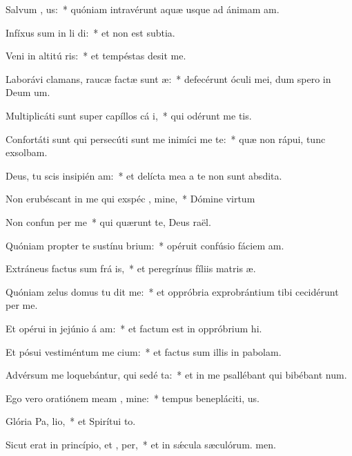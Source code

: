 \item Salvum  , us:~* quóniam intravérunt aquæ usque ad ánimam am.
\item Infíxus sum in li di:~* et non est subtia.
\item Veni in altitú ris:~* et tempéstas desit me.
\item Laborávi clamans, raucæ factæ sunt  æ:~* defecérunt óculi mei, dum spero in Deum um.
\item Multiplicáti sunt super capíllos cá i,~* qui odérunt me tis.
\item Confortáti sunt qui persecúti sunt me inimíci me te:~* quæ non rápui, tunc exsolbam.
\item Deus, tu scis insipién am:~* et delícta mea a te non sunt absdita.
\item Non erubéscant in me qui exspéc , mine,~* Dómine virtum
\item Non confun per me~* qui quærunt te, Deus raël.
\item Quóniam propter te sustínu brium:~* opéruit confúsio fáciem am.
\item Extráneus factus sum frá is,~* et peregrínus fíliis matris æ.
\item Quóniam zelus domus tu dit me:~* et oppróbria exprobrántium tibi cecidérunt per me.
\item Et opérui in jejúnio á am:~* et factum est in oppróbrium hi.
\item Et pósui vestiméntum me cium:~* et factus sum illis in pabolam.
\item Advérsum me loquebántur, qui sedé  ta:~* et in me psallébant qui bibébant num.
\item Ego vero oratiónem meam  , mine:~* tempus benepláciti, us.
\item Glória Pa,  lio,~* et Spirítui to.
\item Sicut erat in princípio, et ,  per,~* et in sǽcula sæculórum. men.
